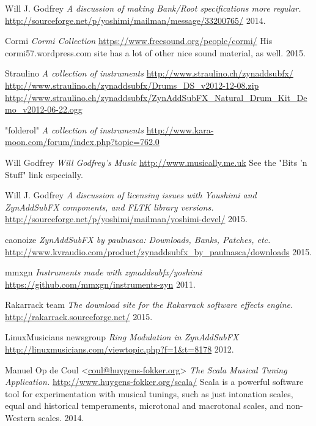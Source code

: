 \begin{thebibliography}{99}

   Will J. Godfrey
   \emph{A discussion of making Bank/Root specifications more regular.}
   \url{http://sourceforge.net/p/yoshimi/mailman/message/33200765/}
   2014.

   Cormi
   \emph{Cormi Collection}
   \url{https://www.freesound.org/people/cormi/}
   His cormi57.wordpress.com site has a lot of other nice sound material, as
   well.
   2015.

   Straulino
   \emph{A collection of instruments}
   \url{http://www.straulino.ch/zynaddsubfx/}
   \url{http://www.straulino.ch/zynaddsubfx/Drums\_DS\_v2012-12-08.zip}
   \url{http://www.straulino.ch/zynaddsubfx/ZynAddSubFX\_Natural\_Drum\_Kit\_Demo\_v2012-06-22.ogg}

   "folderol"
   \emph{A collection of instruments}
   \url{http://www.kara-moon.com/forum/index.php?topic=762.0}

   Will Godfrey
   \emph{Will Godfrey's Music}
   \url{http://www.musically.me.uk}
   See the "Bits 'n Stuff" link especially.

   Will J. Godfrey
   \emph{A discussion of licensing issues with Youshimi and ZynAddSubFX
   components, and FLTK library versions.}
   \url{http://sourceforge.net/p/yoshimi/mailman/yoshimi-devel/}
   2015.

   caonoize
   \emph{ZynAddSubFX by paulnasca: Downloads, Banks, Patches, etc.}
   \url{http://www.kvraudio.com/product/zynaddsubfx\_by\_paulnasca/downloads}
   2015.

   mmxgn
   \emph{Instruments made with zynaddsubfx/yoshimi}
   \url{https://github.com/mmxgn/instruments-zyn}
   2011.

   Rakarrack team
   \emph{The download site for the Rakarrack software effects engine.}
   \url{http://rakarrack.sourceforge.net/}
   2015.

   LinuxMusicians newsgroup
   \emph{Ring Modulation in ZynAddSubFX}
   \url{http://linuxmusicians.com/viewtopic.php?f=1&t=8178}
   2012.

   Manuel Op de Coul <\url{coul@huygens-fokker.org}>
   \emph{The Scala Musical Tuning Application.}
   \url{http://www.huygens-fokker.org/scala/}
   Scala is a powerful software tool for experimentation with musical
   tunings, such as just intonation scales, equal and historical
   temperaments, microtonal and macrotonal scales, and non-Western scales.
   2014.


\end{thebibliography}
